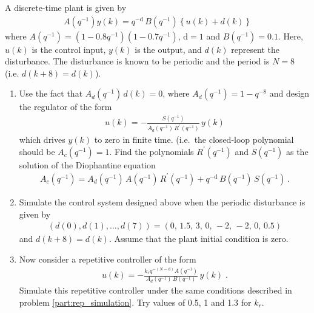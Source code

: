 \item
A discrete-time plant is given by
\begin{align}
\label{rep-pro-plant}
    A(q^{-1}) y(k) = q^{-\textrm{d}} \, B(q^{-1}) \left \{ u(k) + d(k) \right \}
\end{align}
where $A(q^{-1}) = (1 - 0.8 q^{-1})(1 - 0.7 q^{-1})$, $\textrm{d} = 1 $ and $B(q^{-1}) = 0.1$. Here, $u(k)$ is the control input, $y(k)$ is the output, and $d(k)$ represent the disturbance.  The disturbance is known to be periodic and the period is $N = 8$ (i.e. $d(k+8) = d(k)$).

\begin{enumerate}
    \item
    Use the fact that $A_d(q^{-1})\,d(k) = 0$, where $A_d(q^{-1}) = 1-q^{-8}$
    and design the
    regulator of the form
    \begin{align*}
        u(k) = - \frac{S(q^{-1})}{A_d(q^{-1})\, R^{'}(q^{-1})}\, y(k)
    \end{align*}
    which drives $y(k)$ to zero in finite time. (i.e.\ the closed-loop polynomial should be $A_c(q^{-1}) = 1$. Find the polynomials  $R^{'}(q^{-1})$ and $S(q^{-1})$ as the solution of the Diophantine equation
    \begin{align*}
        A_c(q^{-1}) = A_d(q^{-1}) \, A(q^{-1}) \, R^{'}(q^{-1}) + q^{-\textrm{d}} \, B(q^{-1}) \,S(q^{-1}) \,.
    \end{align*}

    \item
    \label{part:rep_simulation}
    Simulate the control system designed above when the periodic disturbance is given by
    \begin{align*}
        (d(0),d(1),\ldots,d(7)) = (0,\, 1.5,\, 3,\, 0,\, -2,\, -2,\, 0,\, 0.5)
    \end{align*}
    and $d(k+8) = d(k)$.  Assume that the plant initial condition is zero.

    \item
    Now consider a repetitive controller of the form
    \begin{align*}
        u(k) = - \frac{k_r q^{-(N-\textrm{d})} A(q^{-1})}{A_d(q^{-1})\, B(q^{-1})}\, y(k) \; .
    \end{align*}
    Simulate this repetitive controller under the same conditions described in problem \ref{part:rep_simulation}. Try values of 0.5, 1 and 1.3 for $k_r$.


\end{enumerate}
